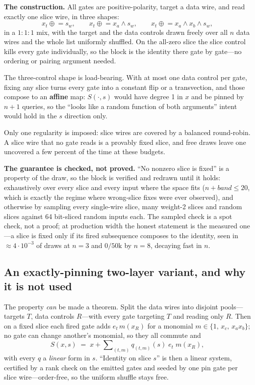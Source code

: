 \documentclass[11pt]{article}
\newcommand{\xor}{\oplus}
\begin{document}
\textbf{The construction.} All gates are positive-polarity, target a data wire,
and read exactly one slice wire, in three shapes:
\[
x_t \mathrel{\xor}= s_w, \qquad
x_t \mathrel{\xor}= x_a \wedge s_w, \qquad
x_t \mathrel{\xor}= x_a \wedge x_b \wedge s_w,
\]
in a $1{:}1{:}1$ mix, with the target and the data controls drawn freely over
all $n$ data wires and the whole list uniformly shuffled. On the all-zero slice
the slice control kills every gate individually, so the block is the identity
there gate by gate---no ordering or pairing argument needed.

The three-control shape is load-bearing. With at most one data control per gate,
fixing any slice turns every gate into a constant flip or a transvection, and
those compose to an \textbf{affine} map: $S(\cdot,s)$ would have degree 1 in $x$
and be pinned by $n{+}1$ queries, so the ``looks like a random function of both
arguments'' intent would hold in the $s$ direction only.

Only one regularity is imposed: slice wires are covered by a balanced
round-robin. A slice wire that no gate reads is a provably fixed slice, and free
draws leave one uncovered a few percent of the time at these budgets.

\textbf{The guarantee is checked, not proved.} ``No nonzero slice is fixed'' is
a property of the draw, so the block is verified and redrawn until it holds:
exhaustively over every slice and every input where the space fits
($n+\mathit{band}\le 20$, which is exactly the regime where wrong-slice fixes
were ever observed), and otherwise by sampling every single-wire slice, many
weight-2 slices and random slices against 64 bit-sliced random inputs each. The
sampled check is a spot check, not a proof; at production width the honest
statement is the measured one---a slice is fixed only if its fired subsequence
composes to the identity, seen in ${\approx}4\cdot10^{-3}$ of draws at $n{=}3$
and $0/50\mathrm{k}$ by $n{=}8$, decaying fast in $n$.

\subsection{An exactly-pinning two-layer variant, and why it is not used}

The property \emph{can} be made a theorem. Split the data wires into disjoint
pools---targets $T$, data controls $R$---with every gate targeting $T$ and
reading only $R$. Then on a fixed slice each fired gate adds $e_t\,m(x_R)$ for a
monomial $m\in\{1,\,x_c,\,x_a x_b\}$; no gate can change another's monomial, so
they all commute and
\[
S(x,s) \;=\; x + \sum\nolimits_{(t,m)} q_{(t,m)}(s)\; e_t\; m(x_R),
\]
with every $q$ a \emph{linear} form in $s$. ``Identity on slice $s$'' is then a
linear system, certified by a rank check on the emitted gates and seeded by one
pin gate per slice wire---order-free, so the uniform shuffle stays free.
\end{document}
